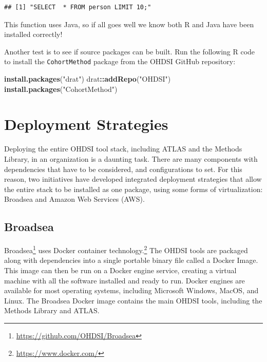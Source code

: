 \documentclass[11pt]{book}
\newenvironment{Shaded}{\begin{snugshade}}{\end{snugshade}}
\newcommand{\KeywordTok}[1]{\textcolor[rgb]{0.13,0.29,0.53}{\textbf{#1}}}
\newcommand{\StringTok}[1]{\textcolor[rgb]{0.31,0.60,0.02}{#1}}
\newcommand{\OperatorTok}[1]{\textcolor[rgb]{0.81,0.36,0.00}{\textbf{#1}}}
\newcommand{\NormalTok}[1]{#1}
\let\rmarkdownfootnote\footnote%
\def\footnote{\protect\rmarkdownfootnote}
\theoremstyle{definition}
\theoremstyle{definition}
\theoremstyle{definition}
\theoremstyle{remark}
\begin{document}
\begin{verbatim}
## [1] "SELECT  * FROM person LIMIT 10;"
\end{verbatim}

This function uses Java, so if all goes well we know both R and Java
have been installed correctly!

Another test is to see if source packages can be built. Run the
following R code to install the \texttt{CohortMethod} package from the
OHDSI GitHub repository:

\begin{Shaded}
\begin{Highlighting}[]
\KeywordTok{install.packages}\NormalTok{(}\StringTok{"drat"}\NormalTok{)}
\NormalTok{drat}\OperatorTok{::}\KeywordTok{addRepo}\NormalTok{(}\StringTok{"OHDSI"}\NormalTok{)}
\KeywordTok{install.packages}\NormalTok{(}\StringTok{"CohortMethod"}\NormalTok{)}
\end{Highlighting}
\end{Shaded}

\section{Deployment Strategies}\label{deployment-strategies}

Deploying the entire OHDSI tool stack, including ATLAS and the Methods
Library, in an organization is a daunting task. There are many
components with dependencies that have to be considered, and
configurations to set. For this reason, two initiatives have developed
integrated deployment strategies that allow the entire stack to be
installed as one package, using some forms of virtualization: Broadsea
and Amazon Web Services (AWS). 

\subsection{Broadsea}\label{broadsea}

Broadsea\footnote{\url{https://github.com/OHDSI/Broadsea}} uses Docker
container technology.\footnote{\url{https://www.docker.com/}} The OHDSI
tools are packaged along with dependencies into a single portable binary
file called a Docker Image. This image can then be run on a Docker
engine service, creating a virtual machine with all the software
installed and ready to run. Docker engines are available for most
operating systems, including Microsoft Windows, MacOS, and Linux. The
Broadsea Docker image contains the main OHDSI tools, including the
Methods Library and ATLAS. 
\end{document}
